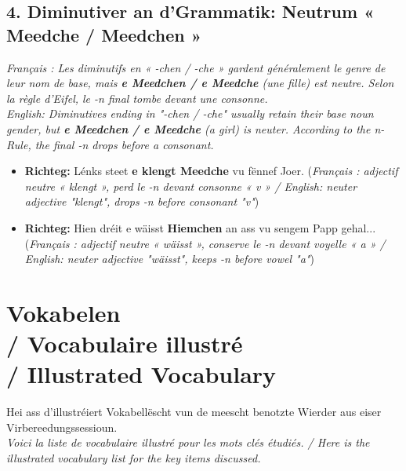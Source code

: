 \subsection*{4. Diminutiver an d'Grammatik: Neutrum « Meedche / Meedchen »}

\noindent\textit{Français : Les diminutifs en « -chen / -che » gardent généralement le genre de leur nom de base, mais \textbf{e Meedchen / e Meedche} (une fille) est neutre. Selon la règle d'Eifel, le -n final tombe devant une consonne.}\\
\textit{English: Diminutives ending in "-chen / -che" usually retain their base noun gender, but \textbf{e Meedchen / e Meedche} (a girl) is neuter. According to the n-Rule, the final -n drops before a consonant.}

\begin{itemize}
    \item \textbf{Richteg:} Lénks steet \textbf{e klengt Meedche} vu fënnef Joer. (\textit{Français : adjectif neutre « klengt », perd le -n devant consonne « v » / English: neuter adjective "klengt", drops -n before consonant "v"})
    \item \textbf{Richteg:} Hien dréit e wäisst \textbf{Hiemchen} an ass vu sengem Papp gehal... (\textit{Français : adjectif neutre « wäisst », conserve le -n devant voyelle « a » / English: neuter adjective "wäisst", keeps -n before vowel "a"})
\end{itemize}

\vspace{1.5em}

\section[Vokabelen / Vocabulaire / Vocabulary]{Vokabelen \\/ Vocabulaire illustré \\/ Illustrated Vocabulary}

Hei ass d'illustréiert Vokabellëscht vun de meescht benotzte Wierder aus eiser Virbereedungssessioun. \\
\textit{Voici la liste de vocabulaire illustré pour les mots clés étudiés. / Here is the illustrated vocabulary list for the key items discussed.}

\vspace{1.5em}


